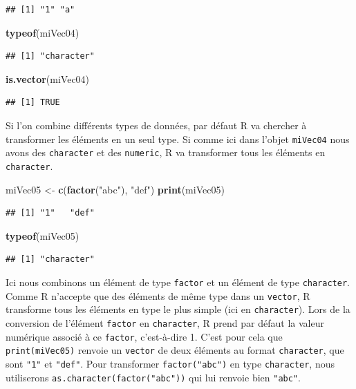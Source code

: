 \documentclass[twoside,symmetric]{book}
\newenvironment{Shaded}{}{}
\newcommand{\KeywordTok}[1]{\textbf{#1}}
\newcommand{\NormalTok}[1]{#1}
\newcommand{\StringTok}[1]{#1}
\begin{document}
\begin{verbatim}
## [1] "1" "a"
\end{verbatim}

\begin{Shaded}
\begin{Highlighting}[]
\KeywordTok{typeof}\NormalTok{(miVec04)}
\end{Highlighting}
\end{Shaded}

\begin{verbatim}
## [1] "character"
\end{verbatim}

\begin{Shaded}
\begin{Highlighting}[]
\KeywordTok{is.vector}\NormalTok{(miVec04)}
\end{Highlighting}
\end{Shaded}

\begin{verbatim}
## [1] TRUE
\end{verbatim}

Si l'on combine différents types de données, par défaut R va chercher à transformer les éléments en un seul type. Si comme ici dans l'objet \texttt{miVec04} nous avons des \texttt{character} et des \texttt{numeric}, R va transformer tous les éléments en \texttt{character}.

\begin{Shaded}
\begin{Highlighting}[]
\NormalTok{miVec05 <-}\StringTok{ }\KeywordTok{c}\NormalTok{(}\KeywordTok{factor}\NormalTok{(}\StringTok{"abc"}\NormalTok{), }\StringTok{"def"}\NormalTok{)}
\KeywordTok{print}\NormalTok{(miVec05)}
\end{Highlighting}
\end{Shaded}

\begin{verbatim}
## [1] "1"   "def"
\end{verbatim}

\begin{Shaded}
\begin{Highlighting}[]
\KeywordTok{typeof}\NormalTok{(miVec05)}
\end{Highlighting}
\end{Shaded}

\begin{verbatim}
## [1] "character"
\end{verbatim}

Ici nous combinons un élément de type \texttt{factor} et un élément de type \texttt{character}. Comme R n'accepte que des éléments de même type dans un \texttt{vector}, R transforme tous les éléments en type le plus simple (ici en \texttt{character}). Lors de la conversion de l'élément \texttt{factor} en \texttt{character}, R prend par défaut la valeur numérique associé à ce \texttt{factor}, c'est-à-dire 1. C'est pour cela que \texttt{print(miVec05)} renvoie un \texttt{vector} de deux éléments au format \texttt{character}, que sont \texttt{"1"} et \texttt{"def"}. Pour transformer \texttt{factor("abc")} en type \texttt{character}, nous utiliserons \texttt{as.character(factor("abc"))} qui lui renvoie bien \texttt{"abc"}.
\end{document}
